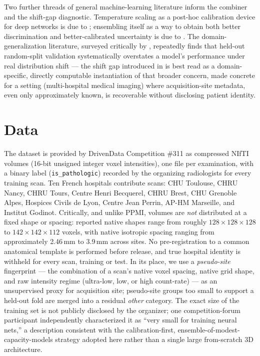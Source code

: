 \documentclass[10pt]{article}
\begin{document}
Two further threads of general machine-learning literature inform the combiner and the shift-gap diagnostic. Temperature scaling as a post-hoc calibration device for deep networks is due to \citet{guo2017}; ensembling itself as a way to obtain both better discrimination and better-calibrated uncertainty is due to \citet{lakshminarayanan2017}. The domain-generalization literature, surveyed critically by \citet{gulrajani2021}, repeatedly finds that held-out random-split validation systematically overstates a model's performance under real distribution shift --- the shift gap introduced in  is best read as a domain-specific, directly computable instantiation of that broader concern, made concrete for a setting (multi-hospital medical imaging) where acquisition-site metadata, even only approximately known, is recoverable without disclosing patient identity.

\section{Data}
\label{sec:data}

The dataset is provided by DrivenData Competition \#311 as compressed NIfTI volumes (16-bit unsigned integer voxel intensities), one file per examination, with a binary label (\texttt{is\_pathologic}) recorded by the organizing radiologists for every training scan. Ten French hospitals contribute scans: CHU Toulouse, CHRU Nancy, CHRU Tours, Centre Henri Becquerel, CHRU Brest, CHU Grenoble Alpes, Hospices Civils de Lyon, Centre Jean Perrin, AP-HM Marseille, and Institut Godinot. Critically, and unlike PPMI, volumes are \emph{not} distributed at a fixed shape or spacing: reported native shapes range from roughly $128\times128\times128$ to $142\times142\times112$ voxels, with native isotropic spacing ranging from approximately 2.46\,mm to 3.9\,mm across sites. No pre-registration to a common anatomical template is performed before release, and true hospital identity is withheld for every scan, training or test. In its place, we use a \emph{pseudo-site} fingerprint --- the combination of a scan's native voxel spacing, native grid shape, and raw intensity regime (ultra-low, low, or high count-rate) --- as an unsupervised proxy for acquisition site; pseudo-site groups too small to support a held-out fold are merged into a residual \emph{other} category. The exact size of the training set is not publicly disclosed by the organizer; one competition-forum participant independently characterized it as ``very small for training neural nets,'' a description consistent with the calibration-first, ensemble-of-modest-capacity-models strategy adopted here rather than a single large from-scratch 3D architecture.
\end{document}
